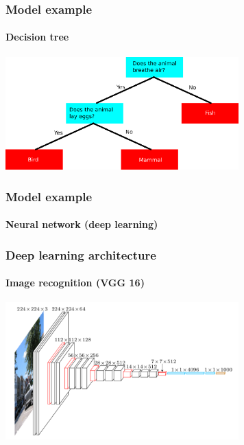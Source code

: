 \documentclass[9pt]{beamer}
\begin{document}
\begin{frame}
  \frametitle{Model example}

  \framesubtitle{Decision tree}

  \begin{center}
    \includegraphics[width = 9cm]{images/decision_tree.png}
  \end{center}

\end{frame}

\begin{frame}
  \frametitle{Model example}

  \framesubtitle{Neural network (deep learning)}

  \begin{center}
    \scalebox{0.7}{
      
    }
  \end{center}
\end{frame}

\begin{frame}
  \frametitle{Deep learning architecture}

  \framesubtitle{Image recognition (VGG 16)}

  \begin{center}
    \includegraphics[width = 9cm]{images/vgg16_architecture.png}
  \end{center}

\end{frame}
\end{document}

